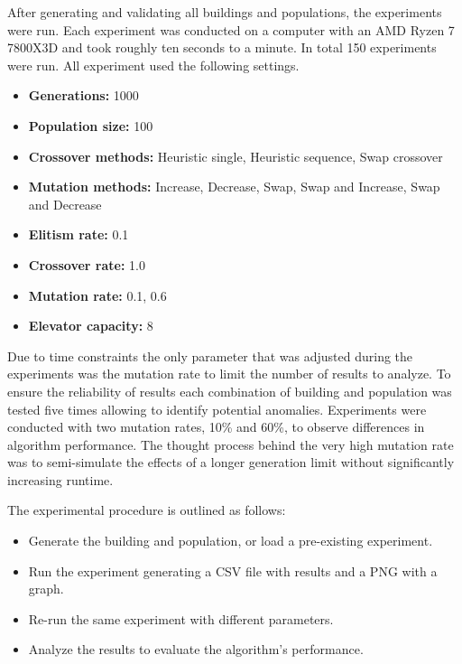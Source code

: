 After generating and validating all buildings and populations, the experiments were run. Each experiment was conducted on a computer with an AMD Ryzen 7 7800X3D and took roughly ten seconds to a minute. In total 150 experiments were run.
\newpage
All experiment used the following settings.

\begin{itemize}
	\item \textbf{Generations:} 1000
	\item \textbf{Population size:} 100
	\item \textbf{Crossover methods:} Heuristic single, Heuristic sequence, Swap crossover
	\item \textbf{Mutation methods:} Increase, Decrease, Swap, Swap and Increase, Swap and Decrease
	\item \textbf{Elitism rate:} 0.1
	\item \textbf{Crossover rate:} 1.0
	\item \textbf{Mutation rate:} 0.1, 0.6
	\item \textbf{Elevator capacity:} 8
\end{itemize}


Due to time constraints the only parameter that was adjusted during the experiments was the mutation rate to limit the number of results to analyze.
To ensure the reliability of results each combination of building and population was tested five times allowing to identify potential anomalies. Experiments were conducted with two mutation rates, 10\% and 60\%, to observe differences in algorithm performance.
The thought process behind the very high mutation rate was to semi-simulate the effects of a longer generation limit without significantly increasing runtime.

The experimental procedure is outlined as follows:

\begin{itemize}
	\item Generate the building and population, or load a pre-existing experiment.
	\item Run the experiment generating a CSV file with results and a PNG with a graph.
	\item Re-run the same experiment with different parameters.
	\item Analyze the results to evaluate the algorithm's performance.
\end{itemize}
